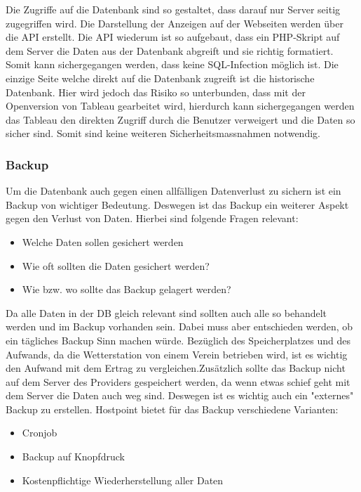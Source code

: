 Die Zugriffe auf die Datenbank sind so gestaltet, dass darauf nur Server seitig zugegriffen wird. Die Darstellung der Anzeigen auf der Webseiten werden über die API erstellt. Die API wiederum ist so aufgebaut, dass ein PHP-Skript auf dem Server die Daten aus der Datenbank abgreift und sie richtig formatiert. Somit kann sichergegangen werden, dass keine SQL-Infection möglich ist. Die einzige Seite welche direkt auf die Datenbank zugreift ist die historische Datenbank. Hier wird jedoch das Risiko so unterbunden, dass mit der Openversion von Tableau gearbeitet wird, hierdurch kann sichergegangen werden das Tableau den direkten Zugriff durch die Benutzer verweigert und die Daten so sicher sind. Somit sind keine weiteren Sicherheitsmassnahmen notwendig.

\subsubsection{Backup}

Um die Datenbank auch gegen einen allfälligen Datenverlust zu sichern ist ein Backup von wichtiger Bedeutung. Deswegen ist das Backup ein weiterer Aspekt gegen den Verlust von Daten. Hierbei sind folgende Fragen relevant:
\begin{itemize}
\item Welche Daten sollen gesichert werden
\item Wie oft sollten die Daten gesichert werden?
\item Wie bzw. wo sollte das Backup gelagert werden?
\end{itemize}

Da alle Daten in der DB gleich relevant sind sollten auch alle so behandelt werden und im Backup vorhanden sein. Dabei muss aber entschieden werden, ob ein tägliches Backup Sinn machen würde. Bezüglich des Speicherplatzes und des Aufwands, da die Wetterstation von einem Verein betrieben wird, ist es wichtig den Aufwand mit dem Ertrag zu vergleichen.Zusätzlich sollte das Backup nicht auf dem Server des Providers gespeichert werden, da wenn etwas schief geht mit dem Server die Daten auch weg sind. Deswegen ist es wichtig auch ein "externes" Backup zu erstellen. Hostpoint bietet für das Backup verschiedene Varianten:
\begin{itemize}
\item Cronjob
\item Backup auf Knopfdruck
\item Kostenpflichtige Wiederherstellung aller Daten
\end{itemize}


